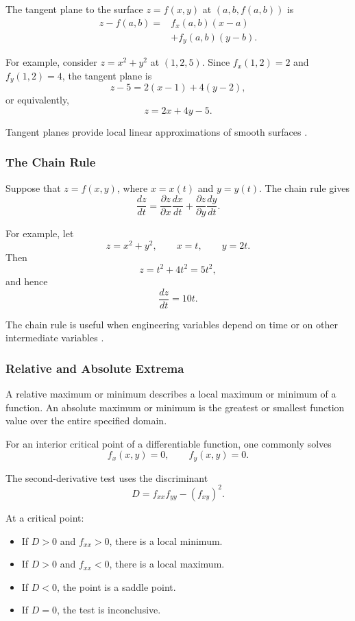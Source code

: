 \documentclass[a4paper,12pt]{article}
\theoremstyle{mystyle}
\numberwithin{equation}{section}
\numberwithin{theorem}{section}
\numberwithin{proposition}{section}
\numberwithin{example}{section}
\numberwithin{remark}{section}
\numberwithin{lemma}{section}
\numberwithin{corollary}{section}
\numberwithin{definition}{section}
\begin{document}
The tangent plane to the surface $z=f(x,y)$ at
$(a,b,f(a,b))$ is
\[
\begin{aligned}
z-f(a,b)
={}&f_x(a,b)(x-a)\\
 &+f_y(a,b)(y-b).
\end{aligned}
\]

For example, consider $z=x^2+y^2$ at $(1,2,5)$.
Since $f_x(1,2)=2$ and $f_y(1,2)=4$, the tangent
plane is
\[
z-5=2(x-1)+4(y-2),
\]
or equivalently,
\[
z=2x+4y-5.
\]

Tangent planes provide local linear approximations
of smooth surfaces \cite{openstax2022}.

\subsubsection{The Chain Rule}

Suppose that $z=f(x,y)$, where $x=x(t)$ and
$y=y(t)$. The chain rule gives
\[
\frac{dz}{dt}
=\frac{\partial z}{\partial x}\frac{dx}{dt}
+\frac{\partial z}{\partial y}\frac{dy}{dt}.
\]

For example, let
\[
z=x^2+y^2,\qquad x=t,\qquad y=2t.
\]
Then
\[
z=t^2+4t^2=5t^2,
\]
and hence
\[
\frac{dz}{dt}=10t.
\]

The chain rule is useful when engineering variables
depend on time or on other intermediate variables
\cite{openstaxchain}.

\subsubsection{Relative and Absolute Extrema}

A relative maximum or minimum describes a local
maximum or minimum of a function. An absolute
maximum or minimum is the greatest or smallest
function value over the entire specified domain.

For an interior critical point of a differentiable
function, one commonly solves
\[
f_x(x,y)=0,\qquad f_y(x,y)=0.
\]

The second-derivative test uses the discriminant
\[
D=f_{xx}f_{yy}-(f_{xy})^2.
\]

At a critical point:
\begin{itemize}
  \item If $D>0$ and $f_{xx}>0$, there is a local minimum.
  \item If $D>0$ and $f_{xx}<0$, there is a local maximum.
  \item If $D<0$, the point is a saddle point.
  \item If $D=0$, the test is inconclusive.
\end{itemize}
\end{document}
